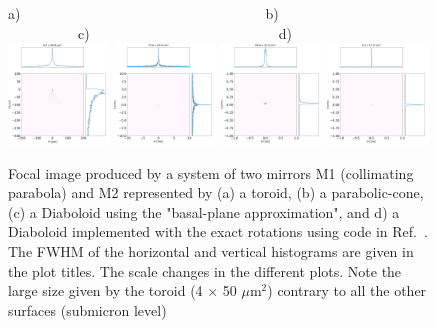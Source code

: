 \documentclass{iucr}              %
\begin{document}
\begin{figure}[h]
\flushleft
a)~~~~~~~~~~~~~~~~~~~~~~~~~~~~~~~~~~~b)~~~~~~~~~~~~~~~~~~~~~~~~~~~~~~~c)~~~~~~~~~~~~~~~~~~~~~~~~~~~d)\\
\centering
\includegraphics[width=0.24\textwidth]{figures/bl_point_toroid.png}
\includegraphics[width=0.24\textwidth]{figures/bl_point_parabolic-cone.png}
\includegraphics[width=0.24\textwidth]{figures/bl_point_diaboloid.png}
\includegraphics[width=0.24\textwidth]{figures/bl_point_diaboloid-exact.png}
\caption{\label{fig:bl}Focal image produced by a system of two mirrors M1 (collimating parabola) and M2 represented by (a) a toroid, (b) a parabolic-cone, (c) a Diaboloid using the "basal-plane approximation", and d) a Diaboloid implemented with the exact rotations using code in Ref.~\cite{lacey}. The FWHM of the horizontal and vertical histograms are given in the plot titles. The scale changes in the different plots. Note the large size given by the toroid (4 $\times$ 50 $\mu$m$^2$) contrary to all the other surfaces (submicron level)
}
\end{figure}
\end{document}
